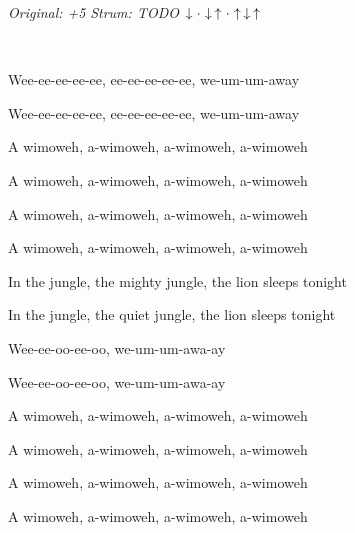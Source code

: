 \begin{song}


\begin{headerbox}
\textit{Original: +5} \quad
\textit{Strum: TODO} $\Down\Miss\Down\Up\Miss\Up\Down\Up$
\end{headerbox}

\begin{hchordbox}
\end{hchordbox}

\Large

\Intro\  \par
Wee-ee-ee-ee-ee, ee-ee-ee-ee-ee, we-um-um-away \par
Wee-ee-ee-ee-ee, ee-ee-ee-ee-ee, we-um-um-away \par

\bigskip

A wimoweh, a-wimoweh, a-wimoweh, a-wimoweh \par
A wimoweh, a-wimoweh, a-wimoweh, a-wimoweh \par
A wimoweh, a-wimoweh, a-wimoweh, a-wimoweh \par
A wimoweh, a-wimoweh, a-wimoweh, a-wimoweh \par

\bigskip

In the jungle, the mighty jungle, the lion sleeps tonight \par
{}In the jungle, the quiet jungle, the lion sleeps tonight \par

\bigskip

\begin{chorusbox}{\Chorus}
 \par

\bigskip

 \par
{}Wee-ee-oo-ee-oo, we-um-um-awa-ay \par
{}Wee-ee-oo-ee-oo, we-um-um-awa-ay \par

\bigskip

 \par
A wimoweh, a-wimoweh, a-wimoweh, a-wimoweh \par
A wimoweh, a-wimoweh, a-wimoweh, a-wimoweh \par
A wimoweh, a-wimoweh, a-wimoweh, a-wimoweh \par
A wimoweh, a-wimoweh, a-wimoweh, a-wimoweh \par
\end{chorusbox}


\end{song}
